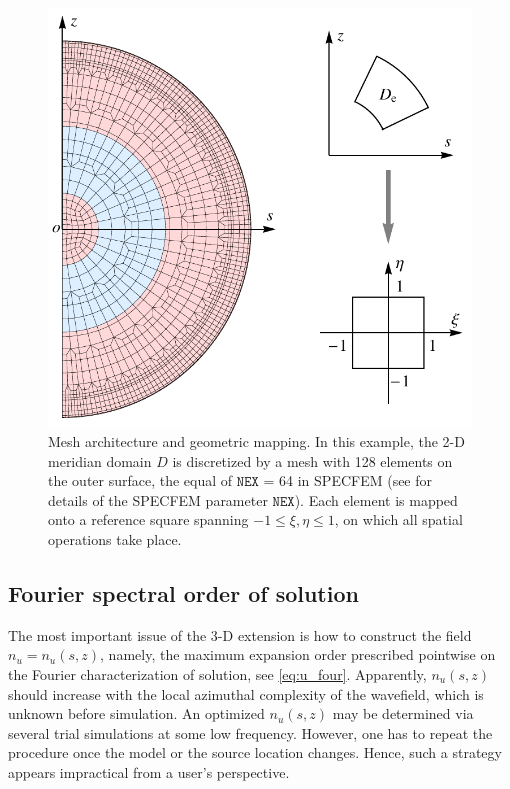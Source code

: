 \documentclass[extra]{gji}
\begin{document}
\begin{figure}
  \centering
  \includegraphics[width=.43\textwidth]{fig/mesh/mesh.pdf}
  \caption{Mesh architecture and geometric mapping. 
  In this example, the 2-D meridian domain $D$ is discretized by
  a mesh with 128 elements on the outer surface, the equal
  of $\mathtt{NEX}$ = 64 in SPECFEM (see \cite{carrington2008high} 
  for details of the SPECFEM parameter $\mathtt{NEX}$).
  Each element is mapped onto a reference square spanning 
  $-1\le \xi,\eta \le 1$, 
  on which all spatial operations take place.} 
  \label{fig:mesh}
\end{figure}

\subsection{Fourier spectral order of solution}
The most important issue of the 3-D extension is how to construct the field  
$n_u=n_u\left(s,z\right)$, namely, the maximum expansion order prescribed pointwise on
the Fourier characterization of solution, see \eqref{eq:u_four}. 
Apparently, $n_u\left(s,z\right)$ should increase with the local
azimuthal complexity of the wavefield, which is unknown before simulation. 
An optimized $n_u\left(s,z\right)$ may be determined via several trial 
simulations at some low frequency. However, one has to repeat 
the procedure once the model or the source location changes.
Hence, such a strategy appears impractical from a user's perspective.
\end{document}
